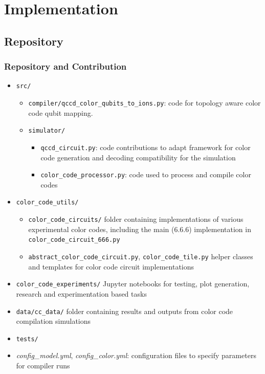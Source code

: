 \chapter{Implementation}

\section{Repository}

\subsection{Repository and Contribution}

\begin{itemize}
    \item \texttt{src/}
    \begin{itemize}
        \item \texttt{compiler/qccd_color_qubits_to_ions.py}: code for topology aware color code qubit mapping.
        \item \texttt{simulator/}
        \begin{itemize}
            \item \texttt{qccd_circuit.py}: code contributions to adapt framework for color code generation and decoding compatibility for the simulation
            \item \texttt{color_code_processor.py}: code used to process and compile color codes
        \end{itemize}
    \end{itemize}

    \item \texttt{color_code_utils/}
    \begin{itemize}
        \item \texttt{color_code_circuits/} folder containing implementations of various experimental color codes, including the main (6.6.6) implementation in \texttt{color_code_circuit_666.py}

        \item \texttt{abstract_color_code_circuit.py}, \texttt{color_code_tile.py} helper classes and templates for color code circuit implementations
    \end{itemize}

    \item \texttt{color_code_experiments/} Jupyter notebooks for testing, plot generation, research and experimentation based tasks

    \item \texttt{data/cc_data/} folder containing results and outputs from color code compilation simulations
    
    \item \texttt{tests/}

    \item \textit{config\_model.yml}, \textit{config\_color.yml}: configuration files to specify parameters for compiler runs
    
\end{itemize}
